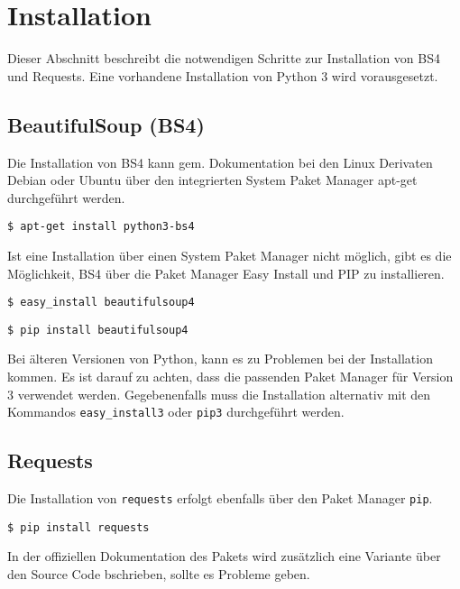 
\chapter{Installation}
\label{chapter-installation}

Dieser Abschnitt beschreibt die notwendigen Schritte zur Installation von BS4 und Requests.
Eine vorhandene Installation von Python 3 wird vorausgesetzt.

\section{BeautifulSoup (BS4)}

Die Installation von BS4 kann gem. Dokumentation\cite{bs4} bei den Linux Derivaten Debian oder Ubuntu über den integrierten System Paket Manager apt-get durchgeführt werden.

\texttt{\$ apt-get install python3-bs4}

Ist eine Installation über einen System Paket Manager nicht möglich, gibt es die Möglichkeit, BS4 über die Paket Manager Easy Install und PIP zu installieren.

\texttt{\$ easy\_install beautifulsoup4}

\texttt{\$ pip install beautifulsoup4}

Bei älteren Versionen von Python, kann es zu Problemen bei der Installation kommen.
Es ist darauf zu achten, dass die passenden Paket Manager für Version 3 verwendet werden. 
Gegebenenfalls muss die Installation alternativ mit den Kommandos \texttt{easy\_install3} oder \texttt{pip3} durchgeführt werden.

\section{Requests}

Die Installation von \texttt{requests} erfolgt ebenfalls über den Paket Manager \texttt{pip}\cite{pypi-requests}.

\texttt{\$ pip install requests}

In der offiziellen Dokumentation des Pakets wird zusätzlich eine Variante über den Source Code bschrieben, sollte es Probleme geben\cite{requests-readthedocs}.